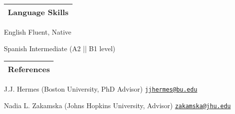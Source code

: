 \documentclass[letterpaper,11pt]{article}
\newenvironment{packed_itemize}{
\begin{itemize}[label=\raisebox{0.25ex}{\tiny$\bullet$}]
  \setlength{\itemsep}{4.2pt}
  \setlength{\parskip}{0pt}
  \setlength{\parsep}{0pt}}{\end{itemize}
}
\begin{document}

\noindent
\begin{tabular*}{\textwidth}{l@{\extracolsep{\fill}}}
\large {\sc \Large{Language Skills}}\\
\hline
\end{tabular*}\vspace{1.mm}

\begin{packed_itemize}
    \item English \hfill Fluent, Native
    \item Spanish \hfill Intermediate (A2 || B1 level)
\end{packed_itemize}



\noindent
\begin{tabular*}{\textwidth}{l@{\extracolsep{\fill}}}
\large {\sc \Large{References}}\\
\hline
\end{tabular*}\vspace{1.mm}

\begin{packed_itemize}
    \item J.J. Hermes (Boston University, PhD Advisor) \hfill \href{mailto:jjhermes@bu.edu}{\texttt{jjhermes@bu.edu}}
    \item Nadia L. Zakamska (Johns Hopkins University, Advisor) \hfill \href{mailto:zakamska@jhu.edu}{\texttt{zakamska@jhu.edu}}
\end{packed_itemize}


\vspace*{\fill}
\end{document}
